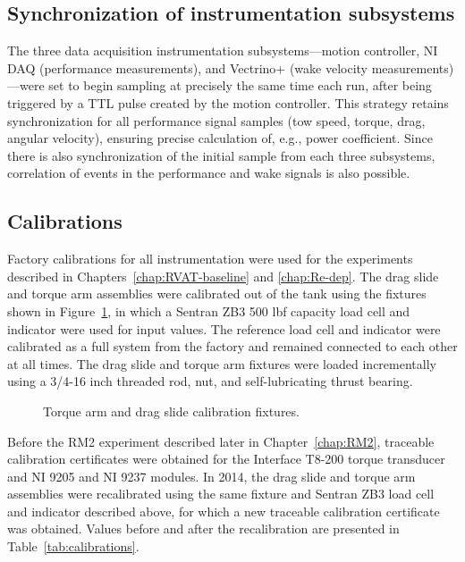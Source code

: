 \subsection{Synchronization of instrumentation subsystems}

The three data acquisition instrumentation subsystems---motion controller, NI
DAQ (performance measurements), and Vectrino+ (wake velocity
measurements)---were set to begin sampling at precisely the same time each run,
after being triggered by a TTL pulse created by the motion controller. This
strategy retains synchronization for all performance signal samples (tow speed,
torque, drag, angular velocity), ensuring precise calculation of, e.g., power
coefficient. Since there is also synchronization of the initial sample from each
three subsystems, correlation of events in the performance and wake signals is
also possible.


\subsection{Calibrations}

Factory calibrations for all instrumentation were used for the experiments
described in Chapters~\ref{chap:RVAT-baseline} and \ref{chap:Re-dep}. The drag
slide and torque arm assemblies were calibrated out of the tank using the
fixtures shown in Figure~\ref{fig:calibration-fixtures}, in which a Sentran ZB3
500 lbf capacity load cell and indicator were used for input values. The
reference load cell and indicator were calibrated as a full system from the
factory and remained connected to each other at all times. The drag slide and
torque arm fixtures were loaded incrementally using a 3/4-16 inch threaded rod,
nut, and self-lubricating thrust bearing.

\begin{figure}
    \caption{Torque arm and drag slide calibration fixtures.}
    
    \label{fig:calibration-fixtures}
\end{figure}

Before the RM2 experiment described later in Chapter~\ref{chap:RM2}, traceable
calibration certificates were obtained for the Interface T8-200 torque
transducer and NI 9205 and NI 9237 modules. In 2014, the drag slide and torque
arm assemblies were recalibrated using the same fixture and Sentran ZB3 load
cell and indicator described above, for which a new traceable calibration
certificate was obtained. Values before and after the recalibration are
presented in Table~\ref{tab:calibrations}.

